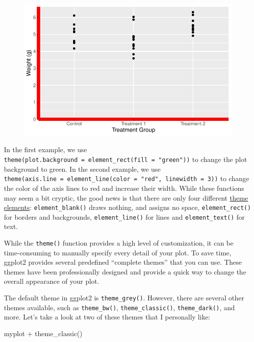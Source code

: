 \documentclass[
  letterpaper,
  DIV=11,
  numbers=noendperiod]{scrartcl}
\newenvironment{Shaded}{\begin{snugshade}}{\end{snugshade}}
\newcommand{\FunctionTok}[1]{\textcolor[rgb]{0.28,0.35,0.67}{#1}}
\newcommand{\NormalTok}[1]{\textcolor[rgb]{0.00,0.23,0.31}{#1}}
\newcommand{\SpecialCharTok}[1]{\textcolor[rgb]{0.37,0.37,0.37}{#1}}
\begin{document}
\begin{figure}[H]

{\centering \includegraphics{ggplot2intro_files/figure-pdf/unnamed-chunk-18-1.pdf}

}

\end{figure}

In the first example, we use
\texttt{theme(plot.background\ =\ element\_rect(fill\ =\ "green"))} to
change the plot background to green. In the second example, we use
\texttt{theme(axis.line\ =\ element\_line(color\ =\ "red",\ linewidth\ =\ 3))}
to change the color of the axis lines to red and increase their width.
While these functions may seem a bit cryptic, the good news is that
there are only four different
\href{https://ggplot2.tidyverse.org/reference/element.html}{theme
elements}: \texttt{element\_blank()} draws nothing, and assigns no
space, \texttt{element\_rect()} for borders and backgrounds,
\texttt{element\_line()} for lines and \texttt{element\_text()} for
text.

While the \texttt{theme()} function provides a high level of
customization, it can be time-consuming to manually specify every detail
of your plot. To save time, ggplot2 provides several predefined
``complete themes'' that you can use. These themes have been
professionally designed and provide a quick way to change the overall
appearance of your plot.

The default theme in ggplot2 is \texttt{theme\_grey()}. However, there
are several other themes available, such as \texttt{theme\_bw()},
\texttt{theme\_classic()}, \texttt{theme\_dark()}, and more. Let's take
a look at two of these themes that I personally like:

\begin{Shaded}
\begin{Highlighting}[]
\NormalTok{myplot }\SpecialCharTok{+}
  \FunctionTok{theme\_classic}\NormalTok{()}
\end{Highlighting}
\end{Shaded}
\end{document}
